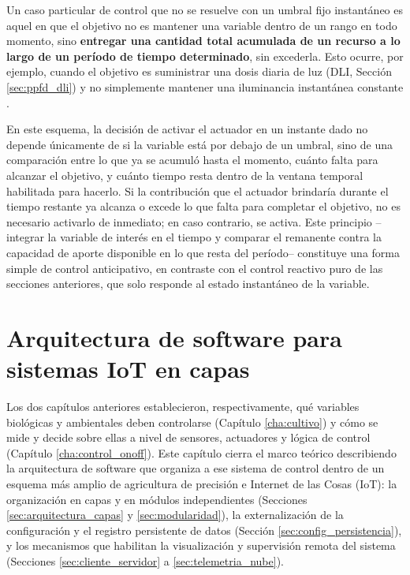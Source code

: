 Un caso particular de control que no se resuelve con un umbral fijo instantáneo es aquel en que el objetivo no es mantener una variable dentro de un rango en todo momento, sino \textbf{entregar una cantidad total acumulada de un recurso a lo largo de un período de tiempo determinado}, sin excederla. Esto ocurre, por ejemplo, cuando el objetivo es suministrar una dosis diaria de luz (DLI, Sección \ref{sec:ppfd_dli}) y no simplemente mantener una iluminancia instantánea constante \cite{albright2000controlling, both1998coordinated}.

En este esquema, la decisión de activar el actuador en un instante dado no depende únicamente de si la variable está por debajo de un umbral, sino de una comparación entre lo que ya se acumuló hasta el momento, cuánto falta para alcanzar el objetivo, y cuánto tiempo resta dentro de la ventana temporal habilitada para hacerlo. Si la contribución que el actuador brindaría durante el tiempo restante ya alcanza o excede lo que falta para completar el objetivo, no es necesario activarlo de inmediato; en caso contrario, se activa. Este principio --integrar la variable de interés en el tiempo y comparar el remanente contra la capacidad de aporte disponible en lo que resta del período-- constituye una forma simple de control anticipativo, en contraste con el control reactivo puro de las secciones anteriores, que solo responde al estado instantáneo de la variable.

\chapter{Arquitectura de software para sistemas IoT en capas}
\label{cha:arquitectura_iot}

Los dos capítulos anteriores establecieron, respectivamente, qué variables biológicas y ambientales deben controlarse (Capítulo \ref{cha:cultivo}) y cómo se mide y decide sobre ellas a nivel de sensores, actuadores y lógica de control (Capítulo \ref{cha:control_onoff}). Este capítulo cierra el marco teórico describiendo la arquitectura de software que organiza a ese sistema de control dentro de un esquema más amplio de agricultura de precisión e Internet de las Cosas (IoT): la organización en capas y en módulos independientes (Secciones \ref{sec:arquitectura_capas} y \ref{sec:modularidad}), la externalización de la configuración y el registro persistente de datos (Sección \ref{sec:config_persistencia}), y los mecanismos que habilitan la visualización y supervisión remota del sistema (Secciones \ref{sec:cliente_servidor} a \ref{sec:telemetria_nube}).

